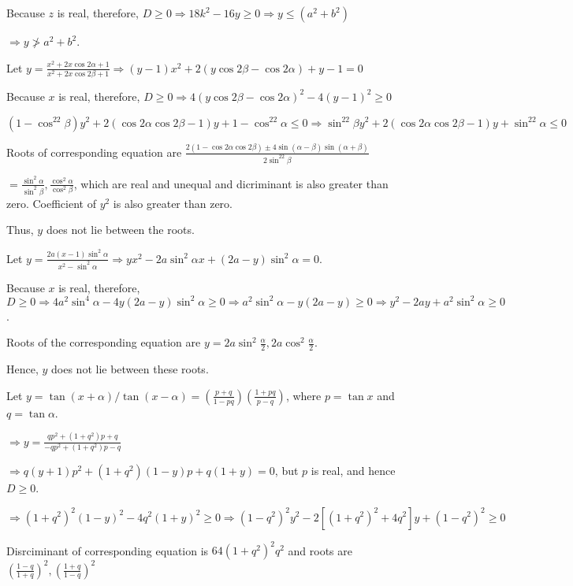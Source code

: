   Because $z$ is real, therefore, $D\geq 0 \Rightarrow 18k^2 - 16y\geq 0 \Rightarrow y\leq (a^2 + b^2)$

  $\Rightarrow y\ngtr a^2 + b^2$.
\item Let $y = \frac{x^2 + 2x\cos2\alpha + 1}{x^2 + 2x\cos2\beta + 1}\Rightarrow (y - 1)x^2 + 2(y\cos2\beta
  - \cos2\alpha) + y - 1 = 0$

  Because $x$ is real, therefore, $D\geq 0 \Rightarrow 4(y\cos2\beta - \cos2\alpha)^2 - 4(y - 1)^2\geq 0$

  $(1 - \cos^22\beta)y^2 + 2(\cos2\alpha\cos2\beta - 1)y + 1 - \cos^22\alpha \leq 0\Rightarrow \sin^22\beta
  y^2 + 2(\cos2\alpha\cos2\beta - 1)y + \sin^22\alpha \leq 0$

  Roots of corresponding equation are $\frac{2(1 - \cos2\alpha\cos2\beta)\pm4\sin(\alpha - \beta)\sin(\alpha
    + \beta)}{2\sin^22\beta}$

  $= \frac{\sin^2\alpha}{\sin^2\beta}, \frac{\cos^2\alpha}{\cos^2\beta}$, which are real and unequal and
  dicriminant is also greater than zero. Coefficient of $y^2$ is also greater than zero.

  Thus, $y$ does not lie between the roots.
\item Let $y = \frac{2a(x - 1)\sin^2\alpha}{x^2 -\sin^2\alpha} \Rightarrow yx^2 - 2a\sin^2\alpha x + (2a -
  y)\sin^2\alpha = 0$.

  Because $x$ is real, therefore, $D\geq 0 \Rightarrow 4a^2\sin^4\alpha - 4y(2a - y)\sin^2\alpha\geq 0
  \Rightarrow a^2\sin^2\alpha - y(2a - y)\geq 0 \Rightarrow y^2 - 2ay + a^2\sin^2\alpha\geq 0$.

  Roots of the corresponding equation are $y = 2a\sin^2\frac{\alpha}{2}, 2a\cos^2\frac{\alpha}{2}$.

  Hence, $y$ does not lie between these roots.
\item Let $y = \tan(x + \alpha)/\tan(x - \alpha) = \left(\frac{p + q}{1 - pq}\right)\left(\frac{1 + pq}{p -
  q}\right)$, where $p = \tan x$ and $q = \tan\alpha$.

  $\Rightarrow y = \frac{qp^2 + (1 + q^2)p + q}{-qp^2 + (1 + q^2)p - q}$

  $\Rightarrow q(y + 1)p^2 + (1 + q^2)(1 - y)p + q(1 + y) = 0$, but $p$ is real, and hence $D\geq 0$.

  $\Rightarrow (1 + q^2)^2(1 - y)^2 - 4q^2(1 + y)^2\geq 0 \Rightarrow (1 - q^2)^2y^2 - 2[(1 + q^2)^2 +
  4q^2]y + (1 - q^2)^2\geq 0$

  Disrciminant of corresponding equation is $64(1 + q^2)^2q^2$ and roots are $\left(\frac{1 - q}{1 +
    q}\right)^2, \left(\frac{1 + q}{1 - q}\right)^2$

